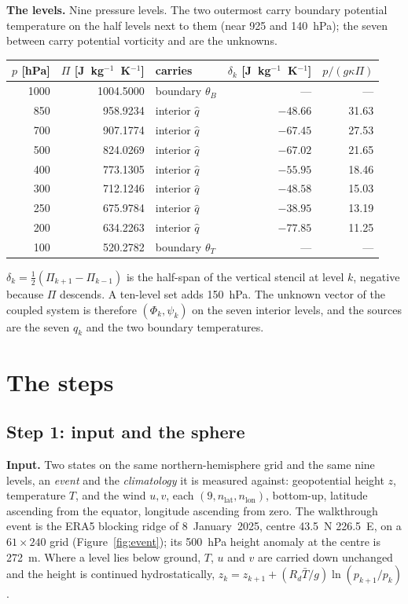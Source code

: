\documentclass[11pt,a4paper]{article}
\begin{document}
\textbf{The levels.} Nine pressure levels. The two outermost carry boundary
potential temperature on the half levels next to them (near 925 and 140~hPa);
the seven between carry potential vorticity and are the unknowns.
\begin{center}
\small
\begin{tabular}{rrlrr}
\toprule
$p$ [hPa] & $\Pi$ [J~kg$^{-1}$~K$^{-1}$] & carries &
$\delta_k$ [J~kg$^{-1}$~K$^{-1}$] & $p/(g\kappa\Pi)$ \\
\midrule
1000 & 1004.5000 & boundary $\theta_B$ & ---     & ---    \\
 850 &  958.9234 & interior $\hat q$   & $-48.66$ & 31.63 \\
 700 &  907.1774 & interior $\hat q$   & $-67.45$ & 27.53 \\
 500 &  824.0269 & interior $\hat q$   & $-67.02$ & 21.65 \\
 400 &  773.1305 & interior $\hat q$   & $-55.95$ & 18.46 \\
 300 &  712.1246 & interior $\hat q$   & $-48.58$ & 15.03 \\
 250 &  675.9784 & interior $\hat q$   & $-38.95$ & 13.19 \\
 200 &  634.2263 & interior $\hat q$   & $-77.85$ & 11.25 \\
 100 &  520.2782 & boundary $\theta_T$ & ---     & ---    \\
\bottomrule
\end{tabular}
\end{center}
$\delta_k=\tfrac12(\Pi_{k+1}-\Pi_{k-1})$ is the half-span of the vertical
stencil at level $k$, negative because $\Pi$ descends. A ten-level set adds
150~hPa. The unknown vector of the coupled system is therefore
$(\Phi_k,\psi_k)$ on the seven interior levels, and the sources are the seven
$\hat q_k$ and the two boundary temperatures.

\section{The steps}
\label{sec:steps}

\subsection{Step 1: input and the sphere}
\label{sec:step1}

\textbf{Input.} Two states on the same northern-hemisphere grid and the same
nine levels, an \emph{event} and the \emph{climatology} it is measured
against: geopotential height $z$, temperature $T$, and the wind $u,v$, each
$(9,n_{\text{lat}},n_{\text{lon}})$, bottom-up, latitude ascending from the
equator, longitude ascending from zero. The walkthrough event is the ERA5
blocking ridge of 8~January~2025, centre 43.5~N 226.5~E, on a $61\times240$
grid (Figure~\ref{fig:event}); its 500~hPa height anomaly at the centre is
272~m. Where a level lies below ground, $T$, $u$ and $v$ are carried down
unchanged and the height is continued hydrostatically,
$z_k = z_{k+1} + (R_d\bar T/g)\ln(p_{k+1}/p_k)$.
\end{document}
